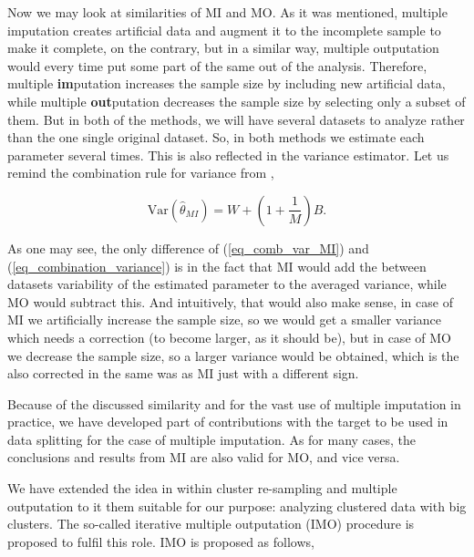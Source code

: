 \documentclass[11pt,a5paper,twoside]{book}
\begin{document}
Now we may look at similarities of MI and MO. As it was mentioned, multiple imputation creates artificial data and augment it to the incomplete sample to make it complete, on the contrary, but in a similar way, multiple outputation would every time put some part of the same out of the analysis. Therefore, multiple \textbf{im}putation increases the sample size by including new artificial data, while multiple \textbf{out}putation decreases the sample size by selecting only a subset of them. But in both of the methods, we will have several datasets to analyze rather than the one single original dataset. So, in both methods we estimate each parameter several times. This is also reflected in the variance estimator. Let us remind the combination rule for variance from \cite{rubin1987},

\begin{equation}
\label{eq_comb_var_MI}
\mathrm{Var}(\widehat{\theta}_{MI}) = W + (1 + \frac{1}{M}) B.
\end{equation}

As one may see, the only difference of (\ref{eq_comb_var_MI}) and (\ref{eq_combination_variance}) is in the fact that MI would add the between datasets variability of the estimated parameter to the averaged variance, while MO would subtract this. And intuitively, that would also make sense, in case of MI we artificially increase the sample size, so we would get a smaller variance which needs a correction (to become larger, as it should be), but in case of MO we decrease the sample size, so a larger variance would be obtained, which is the also corrected in the same was as MI just with a different sign.

Because of the discussed similarity and for the vast use of multiple imputation in practice, we have developed part of contributions with the target to be used in data splitting for the case of multiple imputation. As for many cases, the conclusions and results from MI are also valid for MO, and vice versa. 

We have extended the idea in within cluster re-sampling and multiple outputation to it them suitable for our purpose: analyzing clustered data with big clusters. The so-called iterative multiple outputation (IMO) procedure is proposed to fulfil this role. IMO is proposed as follows,
\end{document}
